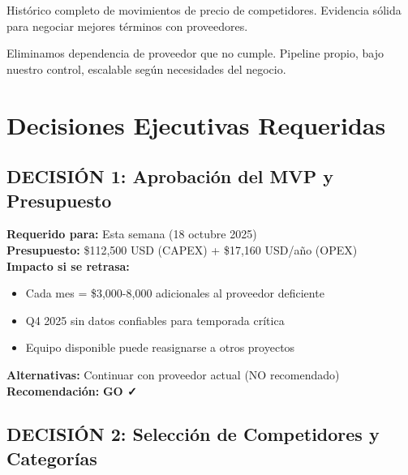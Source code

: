\documentclass[12pt,a4paper]{article}
\begin{document}
\begin{tcolorbox}[colback=primaryblue!10, colframe=primaryblue, title=\textbf{4. Poder de Negociación con Marcas}]
Histórico completo de movimientos de precio de competidores. Evidencia sólida para negociar mejores términos con proveedores.
\end{tcolorbox}

\begin{tcolorbox}[colback=successgreen!10, colframe=successgreen, title=\textbf{5. Independencia Estratégica}]
Eliminamos dependencia de proveedor que no cumple. Pipeline propio, bajo nuestro control, escalable según necesidades del negocio.
\end{tcolorbox}

\newpage
\section{Decisiones Ejecutivas Requeridas}

\subsection*{DECISIÓN 1: Aprobación del MVP y Presupuesto}

\begin{tcolorbox}[colback=lightgray, colframe=black]
\textbf{Requerido para:} Esta semana (18 octubre 2025)\\
\textbf{Presupuesto:} \$112,500 USD (CAPEX) + \$17,160 USD/año (OPEX)\\
\textbf{Impacto si se retrasa:}
\begin{itemize}[leftmargin=*]
    \item Cada mes = \$3,000-8,000 adicionales al proveedor deficiente
    \item Q4 2025 sin datos confiables para temporada crítica
    \item Equipo disponible puede reasignarse a otros proyectos
\end{itemize}
\textbf{Alternativas:} Continuar con proveedor actual (NO recomendado)\\
\textbf{Recomendación:} \textcolor{successgreen}{\textbf{GO ✓}}
\end{tcolorbox}

\subsection*{DECISIÓN 2: Selección de Competidores y Categorías}
\end{document}
